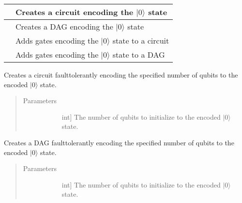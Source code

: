 \documentclass[letterpaper,10pt,english]{sphinxmanual}
\begin{document}
\begin{fulllineitems}
\begin{savenotes}
\begin{tabulary}{\linewidth}[t]{|T|T|}
&
Creates a circuit encoding the \(|0\rangle\) state
\\
\hline
{}
&
Creates a DAG encoding the \(|0\rangle\) state
\\
\hline
{}
&
Adds gates encoding the \(|0\rangle\) state to a circuit
\\
\hline
{}
&
Adds gates encoding the \(|0\rangle\) state to a DAG
\\
\hline
\end{tabulary}
\par
\sphinxattableend\end{savenotes}

\begin{fulllineitems}
\label{\detokenize{Steane:Steane.SteaneFaultTolerantEncoder.createEncoderCircuit}}
Creates a circuit fault\sphinxhyphen{}tolerantly encoding the specified number of qubits to the encoded \(|0\rangle\) state.
\begin{quote}\begin{description}
\item[{Parameters}] \leavevmode\begin{description}
\item[{}] \leavevmode{[}int{]}
The number of qubits to initialize to the encoded \(|0\rangle\) state.

\end{description}

\end{description}\end{quote}

\end{fulllineitems}


\begin{fulllineitems}
\label{\detokenize{Steane:Steane.SteaneFaultTolerantEncoder.createEncoderDag}}
Creates a DAG fault\sphinxhyphen{}tolerantly encoding the specified number of qubits to the encoded \(|0\rangle\) state.
\begin{quote}\begin{description}
\item[{Parameters}] \leavevmode\begin{description}
\item[{}] \leavevmode{[}int{]}
The number of qubits to initialize to the encoded \(|0\rangle\) state.


\end{description}
\end{description}
\end{quote}
\end{fulllineitems}
\end{fulllineitems}
\end{document}
